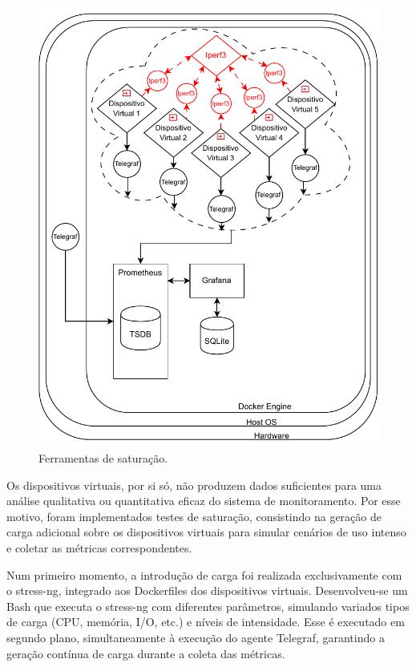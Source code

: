 \begin{figure}[H]
\centering
\includegraphics[scale=1]{Imagens/chap03/by-blocks/saturation_diagram.pdf}
\caption{Ferramentas de saturação.}
\label{fig:DiagramaSaturacao}
\end{figure}

Os dispositivos virtuais, por si só, não produzem dados suficientes para uma análise qualitativa ou quantitativa eficaz do sistema de monitoramento. Por esse motivo, foram implementados testes de saturação, consistindo na geração de carga adicional sobre os dispositivos virtuais para simular cenários de uso intenso e coletar as métricas correspondentes.

Num primeiro momento, a introdução de carga foi realizada exclusivamente com o stress-ng, integrado aos Dockerfiles dos dispositivos virtuais. Desenvolveu-se um  Bash que executa o stress-ng com diferentes parâmetros, simulando variados tipos de carga (CPU, memória, I/O, etc.) e níveis de intensidade. Esse  é executado em segundo plano, simultaneamente à execução do agente Telegraf, garantindo a geração contínua de carga durante a coleta das métricas.

